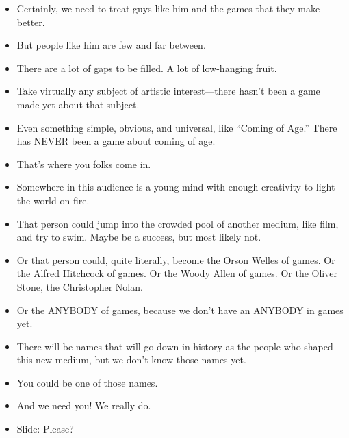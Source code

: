 \documentclass[12pt]{article}
\begin{document}
{\begin{itemize}
\item Certainly, we need to treat guys like him and the games that they make better.

\item But people like him are few and far between.

\item There are a lot of gaps to be filled.  A lot of low-hanging fruit.

\item Take virtually any subject of artistic interest---there hasn't been a game made yet about that subject.

\item Even something simple, obvious, and universal, like ``Coming of Age.''  There has NEVER been a game about coming of age.

\item That's where you folks come in.

\item Somewhere in this audience is a young mind with enough creativity to light the world on fire.

\item That person could jump into the crowded pool of another medium, like film, and try to swim.  Maybe be a success, but most likely not.

\newpage 

\item Or that person could, quite literally, become the Orson Welles of games.  Or the Alfred Hitchcock of games.  Or the Woody Allen of games.  Or the Oliver Stone, the Christopher Nolan.  

\item Or the ANYBODY of games, because we don't have an ANYBODY in games yet.

\item There will be names that will go down in history as the people who shaped this new medium, but we don't know those names yet.

\item You could be one of those names.

\item And we need you! We really do.

\item Slide: Please?

  




\end{itemize}
}
\end{document}
